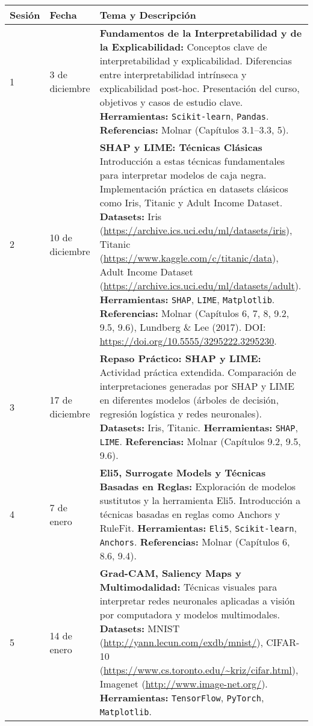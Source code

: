 \newpage
\begin{longtable}{|p{1.2cm}|p{2.8cm}|p{9.5cm}|}
\hline
\textbf{Sesión} & \textbf{Fecha} & \textbf{Tema y Descripción} \\
\hline
1 & 3 de diciembre & \textbf{Fundamentos de la Interpretabilidad y de la Explicabilidad:} 
Conceptos clave de interpretabilidad y explicabilidad. Diferencias entre interpretabilidad intrínseca y explicabilidad post-hoc. Presentación del curso, objetivos y casos de estudio clave. 
\textbf{Herramientas:} \texttt{Scikit-learn}, \texttt{Pandas}. 
\textbf{Referencias:} Molnar (Capítulos 3.1–3.3, 5). \\
\hline
2 & 10 de diciembre & \textbf{SHAP y LIME: Técnicas Clásicas} 
Introducción a estas técnicas fundamentales para interpretar modelos de caja negra. Implementación práctica en datasets clásicos como Iris, Titanic y Adult Income Dataset. 
\textbf{Datasets:} Iris (\url{https://archive.ics.uci.edu/ml/datasets/iris}), Titanic (\url{https://www.kaggle.com/c/titanic/data}), Adult Income Dataset (\url{https://archive.ics.uci.edu/ml/datasets/adult}). 
\textbf{Herramientas:} \texttt{SHAP}, \texttt{LIME}, \texttt{Matplotlib}. 
\textbf{Referencias:} Molnar (Capítulos 6, 7, 8, 9.2, 9.5, 9.6), Lundberg \& Lee (2017). DOI: \url{https://doi.org/10.5555/3295222.3295230}. \\
\hline
3 & 17 de diciembre & \textbf{Repaso Práctico: SHAP y LIME:} 
Actividad práctica extendida. Comparación de interpretaciones generadas por SHAP y LIME en diferentes modelos (árboles de decisión, regresión logística y redes neuronales). 
\textbf{Datasets:} Iris, Titanic. 
\textbf{Herramientas:} \texttt{SHAP}, \texttt{LIME}. 
\textbf{Referencias:} Molnar (Capítulos 9.2, 9.5, 9.6). \\
\hline
4 & 7 de enero & \textbf{Eli5, Surrogate Models y Técnicas Basadas en Reglas:} 
Exploración de modelos sustitutos y la herramienta Eli5. Introducción a técnicas basadas en reglas como Anchors y RuleFit. 
\textbf{Herramientas:} \texttt{Eli5}, \texttt{Scikit-learn}, \texttt{Anchors}. 
\textbf{Referencias:} Molnar (Capítulos 6, 8.6, 9.4). \\
\hline
5 & 14 de enero & \textbf{Grad-CAM, Saliency Maps y Multimodalidad:} 
Técnicas visuales para interpretar redes neuronales aplicadas a visión por computadora y modelos multimodales. 
\textbf{Datasets:} MNIST (\url{http://yann.lecun.com/exdb/mnist/}), CIFAR-10 (\url{https://www.cs.toronto.edu/~kriz/cifar.html}), Imagenet (\url{http://www.image-net.org/}). 
\textbf{Herramientas:} \texttt{TensorFlow}, \texttt{PyTorch}, \texttt{Matplotlib}. 

\end{longtable}
